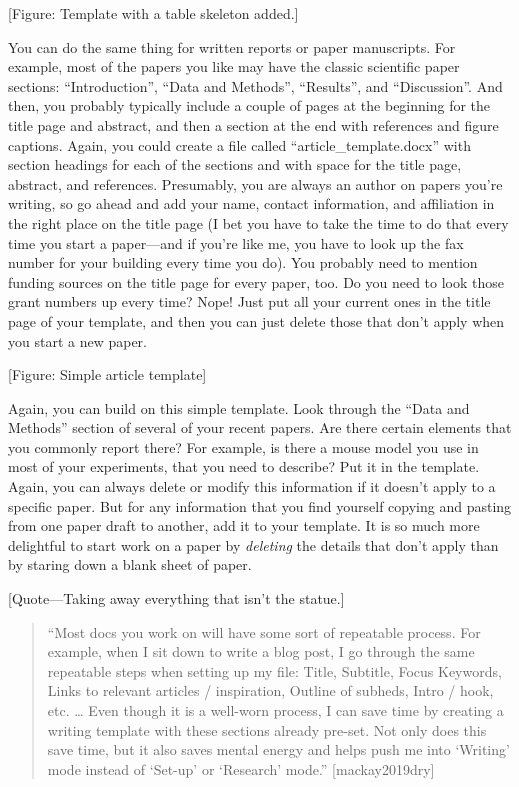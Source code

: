 \documentclass[]{tufte-book}
\begin{document}
{[}Figure: Template with a table skeleton added.{]}

You can do the same thing for written reports or paper manuscripts. For example,
most of the papers you like may have the classic scientific paper sections: ``Introduction'',
``Data and Methods'', ``Results'', and ``Discussion''. And then, you probably typically include
a couple of pages at the beginning for the title page and abstract, and then a section
at the end with references and figure captions. Again, you could create a file called
``article\_template.docx'' with section headings for each of the sections and with space for
the title page, abstract, and references. Presumably, you are always an author on papers you're
writing, so go ahead and add your name, contact information, and affiliation in the right
place on the title page (I bet you have to take the time to do that every time you start
a paper---and if you're like me, you have to look up the fax number for your building
every time you do). You probably need to mention funding sources on the title page for
every paper, too. Do you need to look those grant numbers up every time? Nope! Just
put all your current ones in the title page of your template, and then you can just
delete those that don't apply when you start a new paper.

{[}Figure: Simple article template{]}

Again, you can build on this simple template. Look through the ``Data and Methods''
section of several of your recent papers. Are there certain elements that you commonly
report there? For example, is there a mouse model you use in most of your experiments,
that you need to describe? Put it in the template. Again, you can always delete or
modify this information if it doesn't apply to a specific paper. But for any information
that you find yourself copying and pasting from one paper draft to another, add it to
your template. It is so much more delightful to start work on a paper by \emph{deleting} the
details that don't apply than by staring down a blank sheet of paper.

{[}Quote---Taking away everything that isn't the statue.{]}

\begin{quote}
``Most docs you work on will have some sort of repeatable process. For example,
when I sit down to write a blog post, I go through the same repeatable steps when
setting up my file: Title, Subtitle, Focus Keywords, Links to relevant articles /
inspiration, Outline of subheds, Intro / hook, etc. \ldots{} Even though it is a
well-worn process, I can save time by creating a writing template with these
sections already pre-set. Not only does this save time, but it also saves mental
energy and helps push me into `Writing' mode instead of `Set-up' or `Research' mode.''
{[}mackay2019dry{]}
\end{quote}
\end{document}
